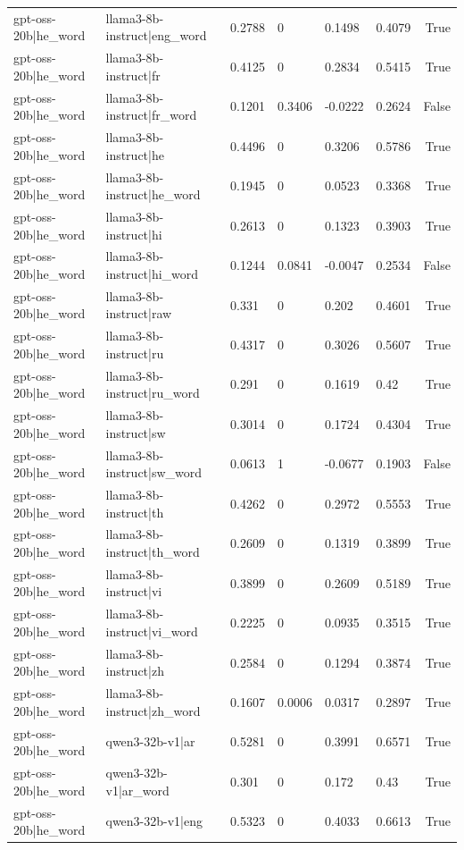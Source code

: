 \begin{table}
\begin{tabular}{llllllr}
gpt-oss-20b|he_word & llama3-8b-instruct|eng_word & 0.2788 & 0 & 0.1498 & 0.4079 & True \\
gpt-oss-20b|he_word & llama3-8b-instruct|fr & 0.4125 & 0 & 0.2834 & 0.5415 & True \\
gpt-oss-20b|he_word & llama3-8b-instruct|fr_word & 0.1201 & 0.3406 & -0.0222 & 0.2624 & False \\
gpt-oss-20b|he_word & llama3-8b-instruct|he & 0.4496 & 0 & 0.3206 & 0.5786 & True \\
gpt-oss-20b|he_word & llama3-8b-instruct|he_word & 0.1945 & 0 & 0.0523 & 0.3368 & True \\
gpt-oss-20b|he_word & llama3-8b-instruct|hi & 0.2613 & 0 & 0.1323 & 0.3903 & True \\
gpt-oss-20b|he_word & llama3-8b-instruct|hi_word & 0.1244 & 0.0841 & -0.0047 & 0.2534 & False \\
gpt-oss-20b|he_word & llama3-8b-instruct|raw & 0.331 & 0 & 0.202 & 0.4601 & True \\
gpt-oss-20b|he_word & llama3-8b-instruct|ru & 0.4317 & 0 & 0.3026 & 0.5607 & True \\
gpt-oss-20b|he_word & llama3-8b-instruct|ru_word & 0.291 & 0 & 0.1619 & 0.42 & True \\
gpt-oss-20b|he_word & llama3-8b-instruct|sw & 0.3014 & 0 & 0.1724 & 0.4304 & True \\
gpt-oss-20b|he_word & llama3-8b-instruct|sw_word & 0.0613 & 1 & -0.0677 & 0.1903 & False \\
gpt-oss-20b|he_word & llama3-8b-instruct|th & 0.4262 & 0 & 0.2972 & 0.5553 & True \\
gpt-oss-20b|he_word & llama3-8b-instruct|th_word & 0.2609 & 0 & 0.1319 & 0.3899 & True \\
gpt-oss-20b|he_word & llama3-8b-instruct|vi & 0.3899 & 0 & 0.2609 & 0.5189 & True \\
gpt-oss-20b|he_word & llama3-8b-instruct|vi_word & 0.2225 & 0 & 0.0935 & 0.3515 & True \\
gpt-oss-20b|he_word & llama3-8b-instruct|zh & 0.2584 & 0 & 0.1294 & 0.3874 & True \\
gpt-oss-20b|he_word & llama3-8b-instruct|zh_word & 0.1607 & 0.0006 & 0.0317 & 0.2897 & True \\
gpt-oss-20b|he_word & qwen3-32b-v1|ar & 0.5281 & 0 & 0.3991 & 0.6571 & True \\
gpt-oss-20b|he_word & qwen3-32b-v1|ar_word & 0.301 & 0 & 0.172 & 0.43 & True \\
gpt-oss-20b|he_word & qwen3-32b-v1|eng & 0.5323 & 0 & 0.4033 & 0.6613 & True \\

\end{tabular}
\end{table}
